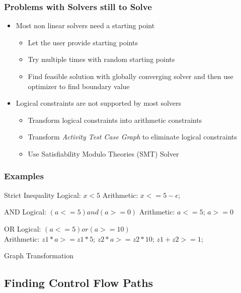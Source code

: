 \documentclass{beamer}
\begin{document}
\begin{frame}
\frametitle{Problems with Solvers still to Solve}
\begin{itemize}
\item Most non linear solvers need a starting point
\begin{itemize}
\item Let the user provide starting points
\item Try multiple times with random starting points
\item Find feasible solution with globally converging solver and then use optimizer to find boundary value
\end{itemize}
\item Logical constraints are not supported by most solvers
\begin{itemize}
\item Transform logical constraints into arithmetic constraints
\item Transform \emph{Activity Test Case Graph} to eliminate logical constraints
\item Use Satisfiability Modulo Theories (SMT) Solver
\end{itemize}
\end{itemize}
\end{frame}

\begin{frame}
\frametitle{Examples}
\begin{block}{Strict Inequality}
Logical: $x<5$ \hspace{1cm} Arithmetic: $x<=5-\epsilon$;
\end{block}
\begin{block}{AND}
Logical: $(a<=5) and (a>=0)$ \hspace{1cm} Arithmetic: $a<=5$; $a>=0$
\end{block}
\begin{block}{OR}
Logical: $(a<=5) or (a>=10)$ \\Arithmetic: $z1*a>=z1*5$; $ z2*a>=z2*10$; $z1+z2>=1$;
\end{block}
\begin{block}{Graph Transformation}

\end{block}
\end{frame}

\subsection{Finding Control Flow Paths}
\end{document}
